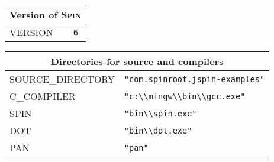 \documentclass[11pt]{article}
\newcommand{\spn}{\textsc{Spin}}
\begin{document}
\begin{center}

\begin{tabular}{|p{}|p{}|}
\hline
\multicolumn{2}{|c|}{Version of \spn{}}\\ \hline
\textsc{\ttfamily VERSION} &\verb+6+\\\hline
\end{tabular}

\bigskip

\begin{tabular}{|p{}|p{}|}
\hline
\multicolumn{2}{|c|}{Directories for source and compilers}\\ \hline
\textsc{\ttfamily SOURCE\_DIRECTORY} & \verb+"com.spinroot.jspin-examples"+ \\
\textsc{\ttfamily C\_COMPILER} &\verb+"c:\\mingw\\bin\\gcc.exe"+ \\
\textsc{\ttfamily SPIN} &\verb+"bin\\spin.exe"+ \\
\textsc{\ttfamily DOT} &\verb+"bin\\dot.exe"+ \\
\textsc{\ttfamily PAN} &\verb+"pan"+ \\ \hline
\end{tabular}

\bigskip


\end{center}
\end{document}
